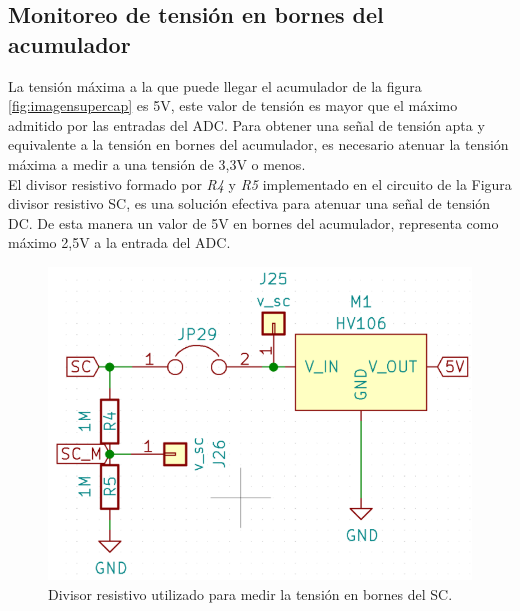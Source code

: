 \subsection{Monitoreo de tensión en bornes del acumulador}
La tensión máxima a la que puede llegar el acumulador de la figura \ref{fig:imagensupercap} es 5V, este valor de tensión es mayor que el máximo admitido por las entradas del ADC. Para obtener una señal de tensión apta y equivalente a la tensión en bornes del acumulador, es necesario atenuar la tensión máxima a medir a una tensión de 3,3V o menos.\\
El divisor resistivo formado por \textit{R4} y \textit{R5} implementado en el circuito de la Figura divisor resistivo SC, es una solución efectiva para atenuar una señal de tensión DC. De esta manera un valor de 5V en bornes del acumulador, representa como máximo 2,5V a la entrada del ADC.\\
\begin{figure}[h!]
	\centering
	\includegraphics[width=0.7\linewidth]{Figures/cto_divisor_resistivo}
	\caption{Divisor resistivo utilizado para medir la tensión en bornes del SC.}
	\label{fig:ctodivisorresistivo}
\end{figure}

